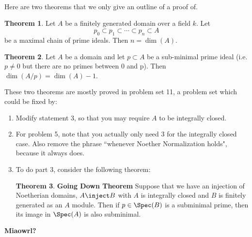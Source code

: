 \documentclass[12 pt]{article}
\theoremstyle{definition}
\newtheorem{thm}{Theorem}[section]
\renewcommand{\(}{\left(}
\renewcommand{\)}{\right)}
\begin{document}
Here are two theorems that we only give an outline of a proof of.

\begin{thm}
Let $A$ be a finitely generated domain over a field $k$. Let
\[p_0 \subset p_1 \subset \cdots  \subset p_n \subset A\]
be a maximal chain of prime ideals. Then $n=\dim(A)$.
\end{thm}


\begin{thm} Let $A$ be a domain and let $p \subset A$ be a sub-minimal prime ideal (i.e. $p \neq 0$ but there are no primes between 0 and p). Then $\dim(A/p)=\dim(A)-1$.
\end{thm}

These two theorems are mostly proved in problem set 11, a problem set which could be fixed by:
\begin{enumerate}
\item Modify statement 3, so that you may require $A$ to be integrally closed.
\item For problem 5, note that you actually only need 3 for the integrally closed case. Also remove the phrase ``whenever Noether Normalization holds", because it always does.
\item To do part 3, consider the following theorem:

\begin{thm} \textbf{Going Down Theorem}
Suppose that we have an injection of Noetherian domains, $A \inject B$ with $A$ is integrally closed and $B$ is finitely generated as an $A$ module. Then if $p \in \Spec(B)$ is a subminimal prime, then its image in $\Spec(A)$ is also subminimal.
\end{thm}
\end{enumerate}






\textcolor[rgb]{1.00,0.00,0.00}{\textbf{Miaowrl?}}










\newpage

\end{document}
